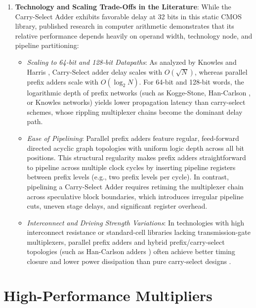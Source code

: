 \begin{enumerate}
    \item \textbf{Technology and Scaling Trade-Offs in the Literature}: While the Carry-Select Adder exhibits favorable delay at 32 bits in this static CMOS library, published research in computer arithmetic demonstrates that its relative performance depends heavily on operand width, technology node, and pipeline partitioning:
    \begin{itemize}
        \item \textit{Scaling to 64-bit and 128-bit Datapaths}: As analyzed by Knowles \cite{knowles2001} and Harris \cite{harris2003taxonomy}, Carry-Select adder delay scales with $O(\sqrt{N})$, whereas parallel prefix adders scale with $O(\log_2 N)$. For 64-bit and 128-bit words, the logarithmic depth of prefix networks (such as Kogge-Stone, Han-Carlson \cite{han1987}, or Knowles networks) yields lower propagation latency than carry-select schemes, whose rippling multiplexer chains become the dominant delay path.
        \item \textit{Ease of Pipelining}: Parallel prefix adders feature regular, feed-forward directed acyclic graph topologies with uniform logic depth across all bit positions. This structural regularity makes prefix adders straightforward to pipeline across multiple clock cycles by inserting pipeline registers between prefix levels (e.g., two prefix levels per cycle). In contrast, pipelining a Carry-Select Adder requires retiming the multiplexer chain across speculative block boundaries, which introduces irregular pipeline cuts, uneven stage delays, and significant register overhead.
        \item \textit{Interconnect and Driving Strength Variations}: In technologies with high interconnect resistance or standard-cell libraries lacking transmission-gate multiplexers, parallel prefix adders and hybrid prefix/carry-select topologies (such as Han-Carlson adders \cite{han1987}) often achieve better timing closure and lower power dissipation than pure carry-select designs \cite{beaumont2001}.
    \end{itemize}
\end{enumerate}


\section{High-Performance Multipliers} \label{sec:high_performance_multipliers}

